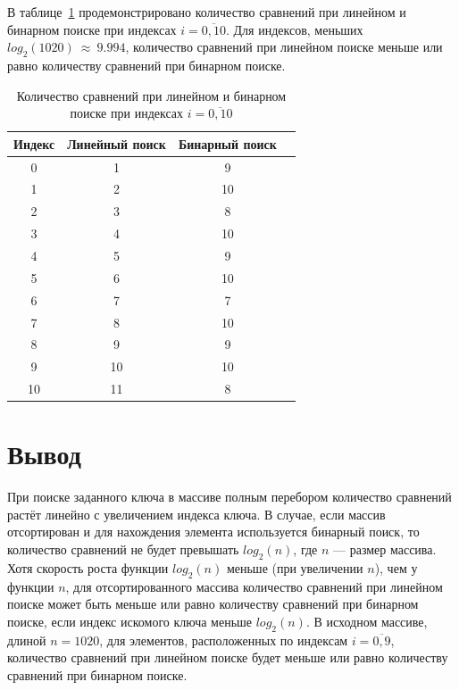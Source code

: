 В таблице~\ref{table:comparisons} продемонстрировано количество сравнений при линейном и бинарном поиске при индексах $i = \overline{0,10}$. Для индексов, меньших $log_2(1020)~\approx~9.994$, количество сравнений при линейном поиске меньше или равно количеству сравнений при бинарном поиске.

\begin{table}[htb]
\caption{Количество сравнений при линейном и бинарном поиске при индексах $i = \overline{0, 10}$}
\small
\centering\begin{tabular}{|c|c|c|c|}
        \hline
        \textbf{Индекс} & \textbf{Линейный поиск} & \textbf{Бинарный поиск} \\
        \hline
        0 & 1 & 9 \\
        \hline
        1 & 2 & 10 \\
        \hline
        2 & 3 & 8 \\
        \hline
        3 & 4 & 10 \\
        \hline
        4 & 5 & 9 \\
        \hline
        5 & 6 & 10 \\
        \hline
        6 & 7 & 7 \\
        \hline
        7 & 8 & 10 \\
        \hline
        8 & 9 & 9 \\
        \hline
        9 & 10 & 10 \\
        \hline
        10 & 11 & 8 \\
        \hline
    \end{tabular}
\label{table:comparisons}
\end{table}

\newpage
\section{Вывод}

При поиске заданного ключа в массиве полным перебором количество сравнений растёт линейно с увеличением индекса ключа. В случае, если массив отсортирован и для нахождения элемента используется бинарный поиск, то количество сравнений не будет превышать $log_2(n)$, где $n$ --- размер массива. Хотя скорость роста функции $log_2(n)$ меньше (при увеличении $n$), чем у функции $n$, для отсортированного массива количество сравнений при линейном поиске может быть меньше или равно количеству сравнений при бинарном поиске, если индекс искомого ключа меньше $log_2(n)$. В исходном массиве, длиной $n = 1020$, для элементов, расположенных по индексам $i = \overline{0, 9}$, количество сравнений при линейном поиске будет меньше или равно количеству сравнений при бинарном поиске.
